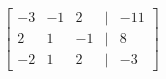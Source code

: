 \documentclass[preview]{standalone}
\begin{document}
\begin{align*}
\begin{bmatrix} -3 & -1 & 2 & | & -11 \\ 2 & 1 & -1 & | & 8 \\ -2 & 1 & 2 & | & -3 \end{bmatrix}
\end{align*}
\end{document}
